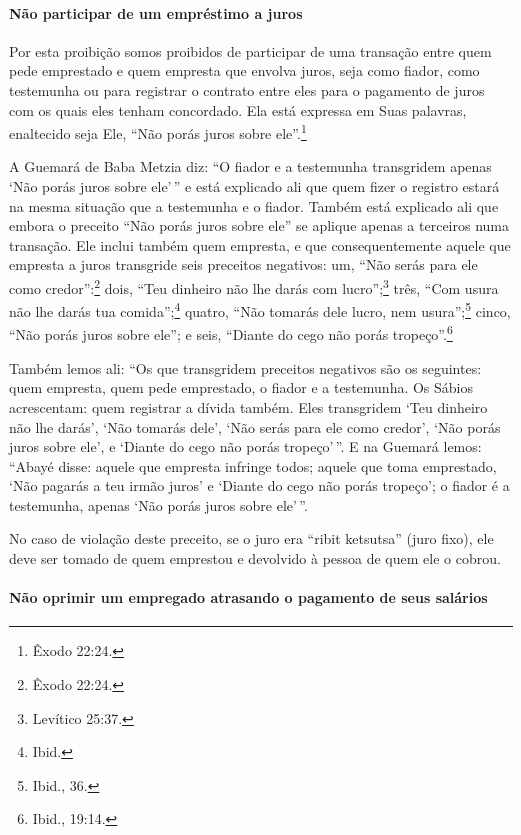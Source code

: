 \paragraph{Não participar de um empréstimo a juros}

Por esta proibição somos proibidos de participar de uma transação entre
quem pede emprestado e quem empresta que envolva juros, seja como
fiador, como testemunha ou para registrar o contrato entre eles para o
pagamento de juros com os quais eles tenham concordado. Ela está
expressa em Suas palavras, enaltecido seja Ele, ``Não porás juros sobre
ele''.\footnote{Êxodo 22:24.}

A Guemará de Baba Metzia diz: ``O fiador e a testemunha transgridem
apenas `Não porás juros sobre ele'\,'' e está explicado ali que quem fizer
o registro estará na mesma situação que a testemunha e o fiador. Também
está explicado ali que embora o preceito ``Não porás juros sobre ele''
se aplique apenas a terceiros numa transação. Ele inclui também quem
empresta, e que consequentemente aquele que empresta a juros transgride
seis preceitos negativos: um, ``Não serás para ele como credor'':\footnote{Êxodo
22:24.} dois, ``Teu dinheiro não lhe darás com lucro'';\footnote{Levítico
25:37.} três, ``Com usura não lhe darás tua comida'';\footnote{Ibid.} quatro,
``Não tomarás dele lucro, nem usura'';\footnote{Ibid., 36.} cinco, ``Não porás
juros sobre ele''; e seis, ``Diante do cego não porás tropeço''.\footnote{Ibid.,
19:14.}

Também lemos ali: ``Os que transgridem preceitos negativos são os
seguintes: quem empresta, quem pede emprestado, o fiador e a testemunha.
Os Sábios acrescentam: quem registrar a dívida também. Eles transgridem
`Teu dinheiro não lhe darás', `Não tomarás dele', `Não serás para ele
como credor', `Não porás juros sobre ele', e `Diante do cego não porás
tropeço'\,''. E na Guemará lemos: ``Abayé disse: aquele que empresta
infringe todos; aquele que toma emprestado, `Não pagarás a teu irmão
juros' e `Diante do cego não porás tropeço'; o fiador é a testemunha,
apenas `Não porás juros sobre ele'\,''.

No caso de violação deste preceito, se o juro era ``ribit ketsutsa''
(juro fixo), ele deve ser tomado de quem emprestou e devolvido à pessoa
de quem ele o cobrou.

\paragraph{Não oprimir um empregado atrasando o pagamento de seus salários}

